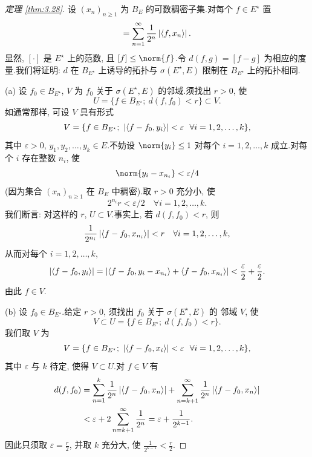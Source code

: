 \begin{proof}[定理 \ref{thm:3.28}]
设 $(x_n)_{n\ge1}$ 为 $B_E$ 的可数稠密子集.对每个 $f\in E^\star$ 置
\begin{equation*}
[f]=\sum_{n=1}^\infty\frac{1}{2^n}\abs{\dual{f}{x_n}}.
\end{equation*}
显然, $[\cdot]$ 是 $E^\star$ 上的范数, 且 $[f]\le\norm{f}$.令
$d(f,g)=[f-g]$ 为相应的度量.我们将证明: $d$ 在 $B_{E^\star}$ 上诱导的拓扑与
$\sigma(E^\star,E)$ 限制在 $B_{E^\star}$ 上的拓扑相同.

(a) 设 $f_0\in B_{E^\star}$, $V$ 为 $f_0$ 关于 $\sigma(E^\star,E)$ 的邻域.须找出
$r>0$, 使
\begin{equation*}
U=\{f\in B_{E^\star};\ d(f,f_0)<r\}\subset V.
\end{equation*}
如通常那样, 可设 $V$ 具有形式
\begin{equation*}
V=\{f\in B_{E^\star};\ \abs{\dual{f-f_0}{y_i}}<\varepsilon
\ \ \forall i=1,2,\dots,k\},
\end{equation*}
其中 $\varepsilon>0$, $y_1,y_2,\dots,y_k\in E$.不妨设
$\norm{y_i}\le1$ 对每个 $i=1,2,\dots,k$ 成立.对每个 $i$ 存在整数 $n_i$, 使
\begin{equation*}
\norm{y_i-x_{n_i}}<\varepsilon/4
\end{equation*}
(因为集合 $(x_n)_{n\ge1}$ 在 $B_E$ 中稠密).取 $r>0$ 充分小, 使
\begin{equation*}
2^{n_i}r<\varepsilon/2\quad\forall i=1,2,\dots,k.
\end{equation*}
我们断言: 对这样的 $r$, $U\subset V$.事实上, 若 $d(f,f_0)<r$, 则
\begin{equation*}
\frac{1}{2^{n_i}}\left|\left\langle f-f_0,x_{n_i}\right\rangle\right|<r\quad\forall i=1,2,\dots,k,
\end{equation*}
从而对每个 $i=1,2,\dots,k$,
\begin{equation*}
\left|\left\langle f-f_0,y_i\right\rangle\right|
=\left|\left\langle f-f_0,y_i-x_{n_i}\right\rangle+\left\langle f-f_0,x_{n_i}\right\rangle\right|
<\frac{\varepsilon}{2}+\frac{\varepsilon}{2}.
\end{equation*}
由此 $f\in V$.

(b) 设 $f_0\in B_{E^\star}$.给定 $r>0$, 须找出 $f_0$ 关于 $\sigma(E^\star,E)$ 的
邻域 $V$, 使
\begin{equation*}
V\subset U=\{f\in B_{E^\star};\ d(f,f_0)<r\}.
\end{equation*}
我们取 $V$ 为
\begin{equation*}
V=\{f\in B_{E^\star};\ \abs{\dual{f-f_0}{x_i}}<\varepsilon
\ \ \forall i=1,2,\dots,k\},
\end{equation*}
其中 $\varepsilon$ 与 $k$ 待定, 使得 $V\subset U$.对 $f\in V$ 有
\begin{equation*}
\begin{aligned}
d(f,f_0)&=\sum_{n=1}^k\frac{1}{2^n}\left|\left\langle f-f_0,x_n\right\rangle\right|
+\sum_{n=k+1}^\infty\frac{1}{2^n}\left|\left\langle f-f_0,x_n\right\rangle\right|\\
&<\varepsilon+2\sum_{n=k+1}^\infty\frac{1}{2^n}
=\varepsilon+\frac{1}{2^{k-1}}.
\end{aligned}
\end{equation*}
因此只须取 $\varepsilon=\frac r2$, 并取 $k$ 充分大, 使
$\frac{1}{2^{k-1}}<\frac r2$.
\end{proof}

